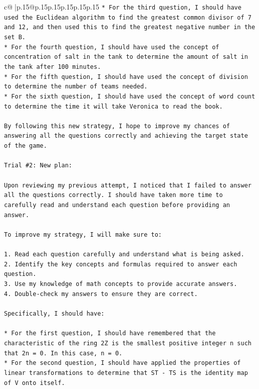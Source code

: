 \documentclass{article}
\begin{document}
{\begin{supertabular}{c@{$\;$}|p{.15\linewidth}@{}p{.15\linewidth}p{.15\linewidth}p{.15\linewidth}p{.15\linewidth}p{.15\linewidth}}
{{{\texttt{* For the third question, I should have used the Euclidean algorithm to find the greatest common divisor of 7 and 12, and then used this to find the greatest negative number in the set B.} \\
\texttt{* For the fourth question, I should have used the concept of concentration of salt in the tank to determine the amount of salt in the tank after 100 minutes.} \\
\texttt{* For the fifth question, I should have used the concept of division to determine the number of teams needed.} \\
\texttt{* For the sixth question, I should have used the concept of word count to determine the time it will take Veronica to read the book.} \\
\\ 
\texttt{By following this new strategy, I hope to improve my chances of answering all the questions correctly and achieving the target state of the game.} \\
\\ 
\texttt{Trial \#2: New plan: } \\
\\ 
\texttt{Upon reviewing my previous attempt, I noticed that I failed to answer all the questions correctly. I should have taken more time to carefully read and understand each question before providing an answer. } \\
\\ 
\texttt{To improve my strategy, I will make sure to:} \\
\\ 
\texttt{1. Read each question carefully and understand what is being asked.} \\
\texttt{2. Identify the key concepts and formulas required to answer each question.} \\
\texttt{3. Use my knowledge of math concepts to provide accurate answers.} \\
\texttt{4. Double{-}check my answers to ensure they are correct.} \\
\\ 
\texttt{Specifically, I should have:} \\
\\ 
\texttt{* For the first question, I should have remembered that the characteristic of the ring 2Z is the smallest positive integer n such that 2n = 0. In this case, n = 0.} \\
\texttt{* For the second question, I should have applied the properties of linear transformations to determine that ST {-} TS is the identity map of V onto itself.} \\
}}}
\end{supertabular}}
\end{document}
